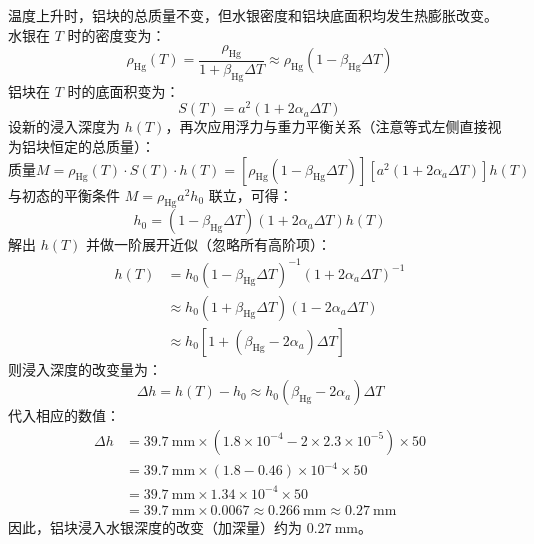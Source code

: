 \begin{solution}
温度上升时，铝块的总质量不变，但水银密度和铝块底面积均发生热膨胀改变。
水银在 $T$ 时的密度变为：
$$ \rho_{\mathrm{Hg}}(T) = \frac{\rho_{\mathrm{Hg}}}{1 + \beta_{\mathrm{Hg}} \Delta T} \approx \rho_{\mathrm{Hg}} (1 - \beta_{\mathrm{Hg}} \Delta T) $$
铝块在 $T$ 时的底面积变为：
$$ S(T) = a^2 (1 + 2\alpha_a \Delta T) $$
设新的浸入深度为 $h(T)$，再次应用浮力与重力平衡关系（注意等式左侧直接视为铝块恒定的总质量）：
$$ \text{质量} M = \rho_{\mathrm{Hg}}(T) \cdot S(T) \cdot h(T) = \left[ \rho_{\mathrm{Hg}} (1 - \beta_{\mathrm{Hg}} \Delta T) \right] \left[ a^2 (1 + 2\alpha_a \Delta T) \right] h(T) $$
与初态的平衡条件 $M = \rho_{\mathrm{Hg}} a^2 h_0$ 联立，可得：
$$ h_0 = (1 - \beta_{\mathrm{Hg}} \Delta T)(1 + 2\alpha_a \Delta T) h(T) $$
解出 $h(T)$ 并做一阶展开近似（忽略所有高阶项）：
\[
\begin{aligned}
h(T) &= h_0 (1 - \beta_{\mathrm{Hg}} \Delta T)^{-1} (1 + 2\alpha_a \Delta T)^{-1}\\
  &\approx h_0 (1 + \beta_{\mathrm{Hg}} \Delta T) (1 - 2\alpha_a \Delta T)\\
  &\approx h_0 \left[ 1 + (\beta_{\mathrm{Hg}} - 2\alpha_a) \Delta T \right]
\end{aligned}
\]
则浸入深度的改变量为：
$$ \Delta h = h(T) - h_0 \approx h_0 (\beta_{\mathrm{Hg}} - 2\alpha_a) \Delta T $$
代入相应的数值：
\begin{align*}
    \Delta h &= 39.7 \ \mathrm{mm} \times \left( 1.8 \times 10^{-4} - 2 \times 2.3 \times 10^{-5} \right) \times 50 \\
             &= 39.7 \ \mathrm{mm} \times (1.8 - 0.46) \times 10^{-4} \times 50 \\
             &= 39.7 \ \mathrm{mm} \times 1.34 \times 10^{-4} \times 50 \\
             &= 39.7 \ \mathrm{mm} \times 0.0067 \approx 0.266 \ \mathrm{mm} \approx 0.27 \ \mathrm{mm}
\end{align*}
因此，铝块浸入水银深度的改变（加深量）约为 $0.27 \ \mathrm{mm}$。
\end{solution}

